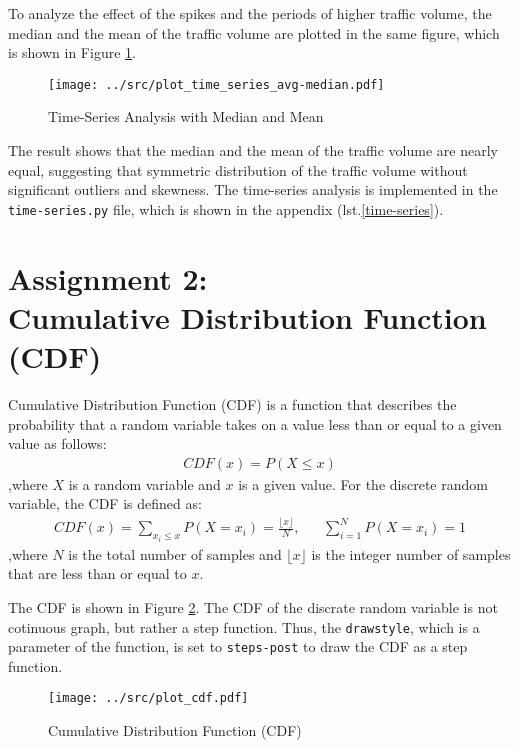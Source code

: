 \documentclass{article}
\begin{document}
To analyze the effect of the spikes and the periods of higher traffic volume, the median and the mean of the traffic volume are plotted in the same figure, which is shown in Figure \ref{fig:time_series_analysis_avg_median}.
\begin{figure}[t]
	\centering
	\texttt{[image: ../src/plot\_time\_series\_avg-median.pdf]}
	\caption{Time-Series Analysis with Median and Mean}
	\label{fig:time_series_analysis_avg_median}
\end{figure}
The result shows that the median and the mean of the traffic volume are nearly equal, suggesting that symmetric distribution of the traffic volume without significant outliers and skewness.
The time-series analysis is implemented in the \texttt{time-series.py} file, which is shown in the appendix (lst.\ref{time-series}).

\section{Assignment 2:\\ Cumulative Distribution Function (CDF)}
Cumulative Distribution Function (CDF) is a function that describes the probability that a random variable takes on a value less than or equal to a given value as follows:
\begin{align}
	\mathit{CDF}(x) = P(X \leq x)
\end{align}
,where \(X\) is a random variable and \(x\) is a given value.
For the discrete random variable, the CDF is defined as:
\begin{align}
	\mathit{CDF}(x) = \sum_{x_i \leq x} P(X = x_i) = \frac{\lfloor{x}\rfloor}{N}, &  & \sum_{i=1}^{N} P(X = x_i) = 1
\end{align}
,where \(N\) is the total number of samples and \(\lfloor{x}\rfloor\) is the integer number of samples that are less than or equal to \(x\).

The CDF is shown in Figure \ref{fig:cdf}.
The CDF of the discrate random variable is not cotinuous graph, but rather a step function.
Thus, the \texttt{drawstyle}, which is a parameter of the  function, is set to \texttt{steps-post} to draw the CDF as a step function.
\begin{figure}[htb]
	\centering
	\texttt{[image: ../src/plot\_cdf.pdf]}
	\caption{Cumulative Distribution Function (CDF)}
	\label{fig:cdf}
\end{figure}
\end{document}
